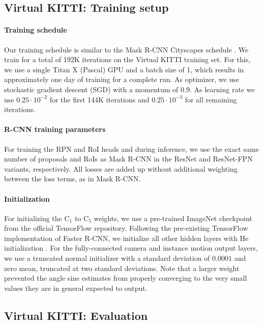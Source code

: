 \subsection{Virtual KITTI: Training setup}
\label{ssec:setup}

\paragraph{Training schedule}
Our training schedule is similar to the Mask R-CNN Cityscapes schedule \cite{MaskRCNN}.
We train for a total of 192K iterations on the Virtual KITTI training set.
For this, we use a single Titan X (Pascal) GPU and a batch size of 1,
which results in approximately one day of training for a complete run.
As optimizer, we use stochastic gradient descent (SGD) \cite{SGD} with a
momentum of $0.9$.
As learning rate we use $0.25 \cdot 10^{-2}$ for the
first 144K iterations and $0.25 \cdot 10^{-3}$ for all remaining iterations.

\paragraph{R-CNN training parameters}
For training the RPN and RoI heads and during inference,
we use the exact same number of proposals and RoIs as Mask R-CNN in
the ResNet and ResNet-FPN variants, respectively.
All losses are added up without additional weighting between the loss terms,
as in Mask R-CNN.

\paragraph{Initialization}
For initializing the  C$_1$ to C$_5$ weights, we use a pre-trained
ImageNet \cite{ImageNet} checkpoint from the official TensorFlow repository.
Following the pre-existing TensorFlow implementation of Faster R-CNN,
we initialize all other hidden layers with He initialization \cite{He}.
For the fully-connected camera and instance motion output layers,
we use a truncated normal initializer with a standard
deviation of $0.0001$ and zero mean, truncated at two standard deviations.
Note that a larger weight prevented the
angle sine estimates from properly converging to the very small values they
are in general expected to output.

\subsection{Virtual KITTI: Evaluation}
\label{ssec:vkitti}

